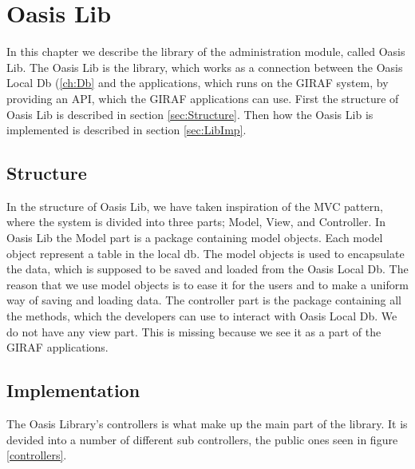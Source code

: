 \chapter{Oasis Lib}
\label{ch:Lib}
In this chapter we describe the library of the administration module, called Oasis Lib. The Oasis Lib is the library, which works as a connection between the Oasis Local Db (\vref{ch:Db} and the applications, which runs on the GIRAF system, by providing an API, which the GIRAF applications can use. First the structure of Oasis Lib is described in section \vref{sec:Structure}. Then how the Oasis Lib is implemented is described in section \vref{sec:LibImp}.

\section{Structure}
\label{sec:Structure}
In the structure of Oasis Lib, we have taken inspiration of the MVC pattern, where the system is divided into three parts; Model, View, and Controller. In Oasis Lib the Model part is a package containing model objects. Each model object represent a table in the local db. The model objects is used to encapsulate the data, which is supposed to be saved and loaded from the Oasis Local Db. The reason that we use model objects is to ease it for the users and to make a uniform way of saving and loading data. The controller part is the package containing all the methods, which the developers can use to interact with Oasis Local Db. We do not have any view part. This is missing because we see it as a part of the GIRAF applications.

\section{Implementation}
\label{sec:LibImp}
The Oasis Library's controllers is what make up the main part of the library. It is devided into a number of different sub controllers, the public ones seen in figure \vref{controllers}.

